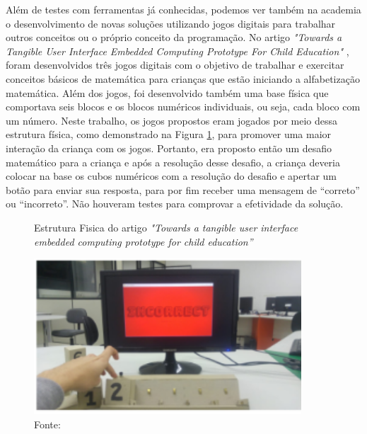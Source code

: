 Além de testes com ferramentas já conhecidas, podemos ver também na academia o desenvolvimento de novas soluções utilizando jogos digitais para trabalhar outros conceitos ou o próprio conceito da programação. No artigo \textit{"Towards a Tangible User Interface Embedded Computing Prototype For Child Education"} \cite{carneiro_2018}, foram desenvolvidos três jogos digitais com o objetivo de trabalhar e exercitar conceitos básicos de matemática para crianças que estão iniciando a alfabetização matemática. Além dos jogos, foi desenvolvido também uma base física que comportava seis blocos e os blocos numéricos individuais, ou seja, cada bloco com um número. Neste trabalho, os jogos propostos eram jogados por meio dessa estrutura física, como demonstrado na Figura \ref{figura:estrutura_artigo_towards}, para promover uma maior interação da criança com os jogos. Portanto, era proposto então um desafio matemático para a criança e após a resolução desse desafio, a criança deveria colocar na base os cubos numéricos com a resolução do desafio e apertar um botão para enviar sua resposta, para por fim receber uma mensagem de “correto” ou “incorreto”. Não houveram testes para comprovar a efetividade da solução. 

\begin{figure}[h!]
    \centering
    \caption{Estrutura Fisica do artigo \textit{"Towards a tangible user interface embedded computing prototype for child education”}}
    \includegraphics[width=10cm]{images/cap2/estrutura_artigo_towards.png}
    \caption*{Fonte: \cite{carneiro_2018}}
    \label{figura:estrutura_artigo_towards}
\end{figure}


